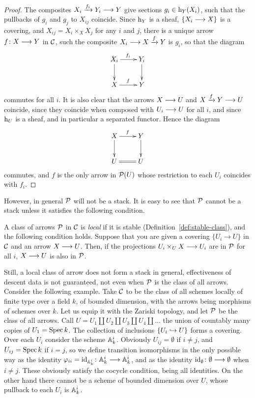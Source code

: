 \begin{4   STACKS}
\begin{4.3 Descent for morphisms of schemes}
\begin{proof}
The composites $X_i \xrightarrow{f_i} Y_i \arr  Y$ give sections $g_i \in \h_Y(X_i)$, such that the pullbacks of $g_i$ and $g_j$ to $X_{ij}$ coincide. Since $\h_Y$ is a sheaf, $\{X_i \arr X\}$ is a covering, and $X_{ij} = X_i \times_X X_j$ for any $i$ and $j$, there is a unique arrow $f \colon X \arr Y$ in $\cC$, such the composite $X_i \arr X \xrightarrow{f} Y$ is $g_i$, so that the diagram
   \[
   \xymatrix{
   X_i \ar[r]^{f_i} \ar[d] &
   Y_i \ar[d] \\
   X \ar[r]^f &
   Y
   }
   \]
commutes for all $i$. It is also clear that the arrows $X \arr U$ and $X \xrightarrow{f} Y \arr U$ coincide, since they coincide when composed with $U_i \arr U$ for all $i$, and since $\h_U$ is a sheaf, and in particular a  separated functor. Hence the diagram
   \[
   \xymatrix{
   X \ar[r]^f \ar[d] & Y \ar[d] \\
   U \ar@{=}[r]      & U
   }
   \]
commutes, and $f$ is the only arrow in $\cP(U)$ whose restriction to each $U_i$ coincides with $f_i$.
\end{proof}


However, in general $\cP$ will not be a stack. It is easy to see that $\cP$ cannot be a stack unless it satisfies the following condition.


\begin{definition}\label{def:local-class}
A class of arrows $\cP$ in $\cC$ is \emph{local}%
%
 if it is stable (Definition~\ref{def:stable-class}), and the following condition holds. Suppose that you are given a covering $\{U_i \to U\}$ in $\cC$ and an arrow $X \arr U$. Then, if the projections $U_i \times_U X \arr U_i$ are in $\cP$ for all $i$, $X \arr U$ is also in $\cP$.
\end{definition}

Still, a local class of arrow does not form a stack in general, effectiveness of descent data is not guaranteed, not even when $\cP$ is the class of all arrows. Consider the following example. Take $\cC$ to be the class of all schemes locally of finite type over a field $k$, of bounded dimension, with the arrows being morphisms of schemes over $k$. Let us equip it with the Zariski topology, and let $\cP$ be the class of all arrows. Call $U = U_1 \coprod U_2 \coprod U_3 \coprod U_4 \coprod \ldots$ the union of countably many copies of $U_1 = \spec k$. The collection of inclusions $\{U_i \into U\}$ forms a covering. Over each $U_i$ consider the scheme $\AA^i_k$. Obviously $U_{ij} = \emptyset$ if $i \neq j$, and $U_{ij} = \spec k$ if $i = j$, so we define transition isomorphisms in the only possible way as the identity $\phi_{ii} = \id_{\AA^i_k} \colon \AA^i_k \arr \AA^i_k$, and as the identity $\id_{\emptyset} \colon \emptyset \arr \emptyset$ when $i \neq j$. These obviously satisfy the cocycle condition, being all identities. On the other hand there cannot be a scheme of bounded dimension over $U$, whose pullback to each $U_i$ is $\AA^i_{k}$.


\end{4.3 Descent for morphisms of schemes}
\end{4   STACKS}
